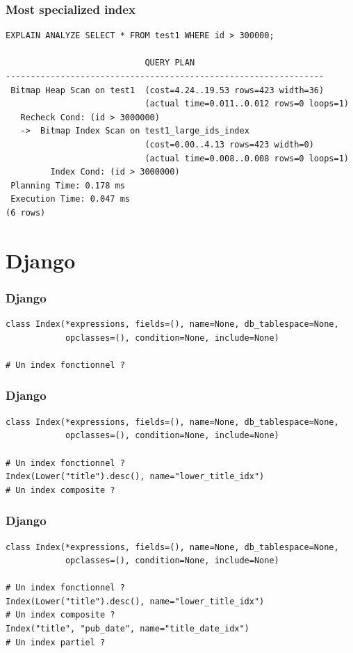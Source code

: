 \documentclass{beamer}
\begin{document}
\begin{frame}[fragile]
    \frametitle{Most specialized index}
    \begin{verbatim}
EXPLAIN ANALYZE SELECT * FROM test1 WHERE id > 300000;

                            QUERY PLAN
----------------------------------------------------------------
 Bitmap Heap Scan on test1  (cost=4.24..19.53 rows=423 width=36)
                            (actual time=0.011..0.012 rows=0 loops=1)
   Recheck Cond: (id > 3000000)
   ->  Bitmap Index Scan on test1_large_ids_index
                            (cost=0.00..4.13 rows=423 width=0)
                            (actual time=0.008..0.008 rows=0 loops=1)
         Index Cond: (id > 3000000)
 Planning Time: 0.178 ms
 Execution Time: 0.047 ms
(6 rows)
    \end{verbatim}
\end{frame}

\section{Django}

\begin{frame}[fragile]
    \frametitle{Django}

    \begin{verbatim}
class Index(*expressions, fields=(), name=None, db_tablespace=None,
            opclasses=(), condition=None, include=None)

# Un index fonctionnel ?
    \end{verbatim}
\end{frame}

\begin{frame}[fragile]
    \frametitle{Django}

    \begin{verbatim}
class Index(*expressions, fields=(), name=None, db_tablespace=None,
            opclasses=(), condition=None, include=None)

# Un index fonctionnel ?
Index(Lower("title").desc(), name="lower_title_idx")
# Un index composite ?
    \end{verbatim}
\end{frame}

\begin{frame}[fragile]
    \frametitle{Django}

    \begin{verbatim}
class Index(*expressions, fields=(), name=None, db_tablespace=None,
            opclasses=(), condition=None, include=None)

# Un index fonctionnel ?
Index(Lower("title").desc(), name="lower_title_idx")
# Un index composite ?
Index("title", "pub_date", name="title_date_idx")
# Un index partiel ?
    \end{verbatim}
\end{frame}
\end{document}
